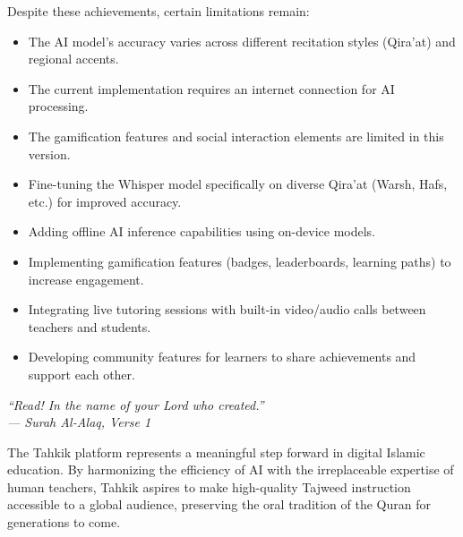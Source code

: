 Despite these achievements, certain limitations remain:
\begin{itemize}
  \item The AI model's accuracy varies across different recitation styles (Qira'at) and regional accents.
  \item The current implementation requires an internet connection for AI processing.
  \item The gamification features and social interaction elements are limited in this version.
\end{itemize}

\begin{goldbox}[title=Future Perspectives]
\begin{itemize}
  \item Fine-tuning the Whisper model specifically on diverse Qira'at (Warsh, Hafs, etc.) for improved accuracy.
  \item Adding offline AI inference capabilities using on-device models.
  \item Implementing gamification features (badges, leaderboards, learning paths) to increase engagement.
  \item Integrating live tutoring sessions with built-in video/audio calls between teachers and students.
  \item Developing community features for learners to share achievements and support each other.
\end{itemize}
\end{goldbox}

\begin{emeraldbox}[title=Closing Statement]
\begin{center}
\large\itshape
``Read! In the name of your Lord who created.''\\[6pt]
\normalsize\normalfont\color{black} --- Surah Al-Alaq, Verse 1
\end{center}
\vspace{6pt}
\normalsize
The Tahkik platform represents a meaningful step forward in digital Islamic education. By harmonizing the efficiency of AI with the irreplaceable expertise of human teachers, Tahkik aspires to make high-quality Tajweed instruction accessible to a global audience, preserving the oral tradition of the Quran for generations to come.
\end{emeraldbox}
